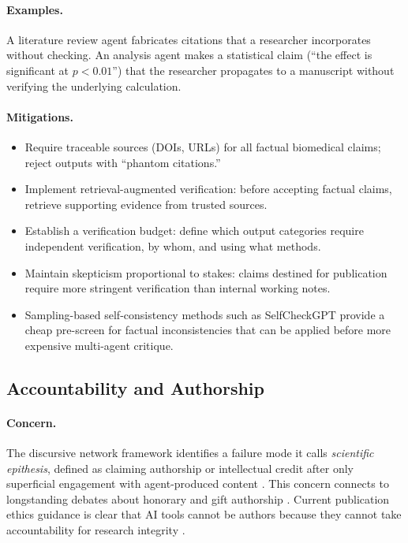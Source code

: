 \documentclass[11pt,letterpaper]{article}
\begin{document}
\paragraph{Examples.} A literature review agent fabricates citations that a researcher incorporates without checking. An analysis agent makes a statistical claim (``the effect is significant at $p < 0.01$'') that the researcher propagates to a manuscript without verifying the underlying calculation.

\paragraph{Mitigations.}
\begin{itemize}[leftmargin=*]
    \item Require traceable sources (DOIs, URLs) for all factual biomedical claims; reject outputs with ``phantom citations.''
    \item Implement retrieval-augmented verification: before accepting factual claims, retrieve supporting evidence from trusted sources.
    \item Establish a verification budget: define which output categories require independent verification, by whom, and using what methods.
    \item Maintain skepticism proportional to stakes: claims destined for publication require more stringent verification than internal working notes.
    \item Sampling-based self-consistency methods such as SelfCheckGPT \cite{manakul2023} provide a cheap pre-screen for factual inconsistencies that can be applied before more expensive multi-agent critique.
\end{itemize}

\subsection{Accountability and Authorship}

\paragraph{Concern.} The discursive network framework identifies a failure mode it calls \emph{scientific epithesis}, defined as claiming authorship or intellectual credit after only superficial engagement with agent-produced content \cite{gutierrez2025}. This concern connects to longstanding debates about honorary and gift authorship \cite{marusic2011}. Current publication ethics guidance is clear that AI tools cannot be authors because they cannot take accountability for research integrity \cite{cope_ai,icmje_authorship,icmje_ai,wame2023}.
\end{document}
